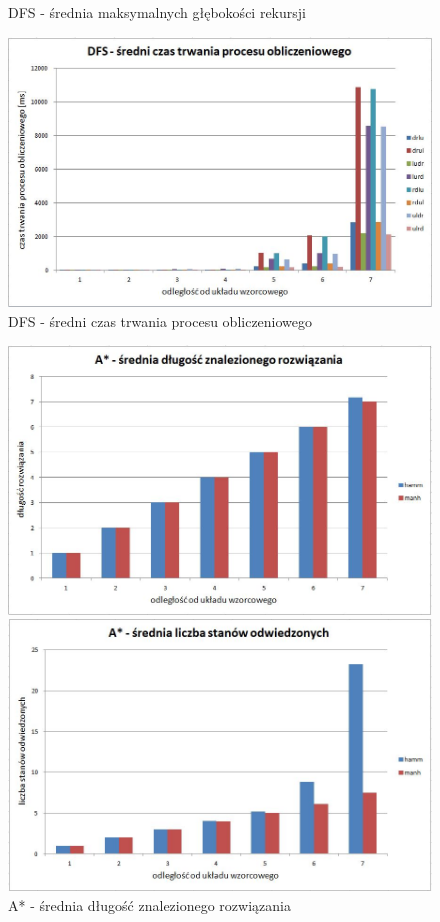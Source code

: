 \documentclass{classrep}
\begin{document}
{\begin{figure}[ht!]
\begin{center}
		\caption{DFS - średnia maksymalnych głębokości rekursji}
		\vspace{0.5in}
		\includegraphics[scale=0.6]{dfs5}
		\caption{DFS - średni czas trwania procesu obliczeniowego}
	\end{center}
\end{figure}
\newpage
\begin{figure}[ht!]
	\begin{center}
		\vspace{0.3in}
		\includegraphics[scale=0.6]{astr1}
		\caption{A* - średnia długość znalezionego rozwiązania}
		\vspace{0.5in}
		\includegraphics[scale=0.6]{astr2}

\end{center}
\end{figure}}
\end{document}
